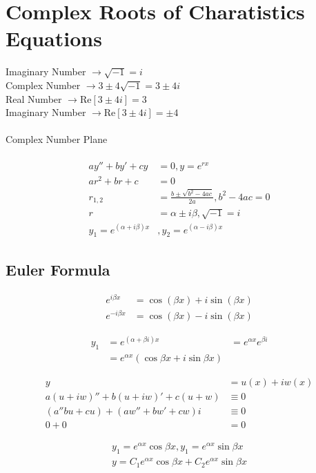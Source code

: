 \documentclass[10pt, letterpaper]{article}
\begin{document}

\section{Complex Roots of Charatistics Equations}
Imaginary Number $\rightarrow \sqrt{-1} = i$\\
Complex Number $\rightarrow 3 \pm 4\sqrt{-1} = 3 \pm 4i$\\
Real Number $\rightarrow \text{Re}[3\pm4i] = 3$\\
Imaginary Number $\rightarrow \text{Re}[3\pm4i] = \pm4$\\
\\
Complex Number Plane\\
\\
\begin{align*}
ay''+by'+cy &= 0, y = e^{rx}\\
ar^2+br+c &= 0\\
r_{1,2} &= \frac{b \pm \sqrt{b^2-4ac}}{2a}, b^2-4ac=0\\
r &= \alpha \pm i\beta, \sqrt{-1} = i\\
y_1=e^{(\alpha+i\beta)x} &, y_2=e^{(\alpha-i\beta)x}
\end{align*}

\subsection{Euler Formula}
\begin{align*}
e^{i\beta x} &= \cos(\beta x) + i\sin(\beta x)\\
e^{-i\beta x} &= \cos(\beta x) - i\sin(\beta x)
\end{align*}

\begin{align*}
y_1 &= e^{(\alpha+\beta i)x} &= e^{\alpha x}e^{\beta i}\\
&= e^{\alpha x} (\cos \beta x + i\sin \beta x)
\end{align*}

\begin{align*}
y &= u(x) + iw(x)\\
a(u+iw)'' + b(u+iw)' + c(u+w) &\equiv 0\\
(a'' bu + cu) + (aw'' + bw' + cw)i &\equiv 0\\
0+0 &= 0
\end{align*}

\begin{align*}
y_1 = e^{\alpha x} \cos \beta x, y_1 = e^{\alpha x} \sin \beta x\\
y = C_1 e^{\alpha x} \cos{\beta x} + C_2 e^{\alpha x} \sin \beta x\\
\end{align*}
\end{document}
